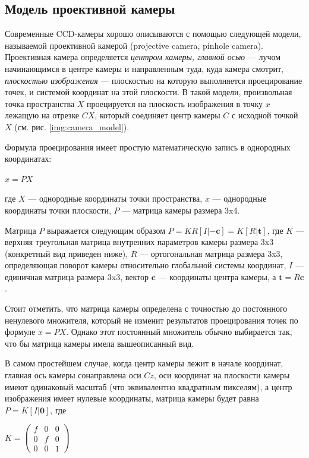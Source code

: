 \subsection{Модель проективной камеры}
Современные CCD-камеры хорошо описываются с помощью следующей модели, называемой проективной камерой (projective camera, pinhole camera). Проективная камера определяется \textit{центром камеры, главной осью} — лучом начинающимся в центре камеры и направленным туда, куда камера смотрит, \textit{плоскостью изображения} — плоскостью на которую выполняется проецирование точек, и системой координат на этой плоскости. В такой модели, произвольная точка пространства $X$ проецируется на плоскость изображения в точку $x$ лежащую на отрезке $CX$, который соединяет центр камеры $C$ с исходной точкой $X$ (см. рис. \ref{img:camera_model}).

Формула проецирования имеет простую математическую запись в однородных координатах: 

$x = P X$

где $X$ — однородные координаты точки пространства, $x$ — однородные координаты точки плоскости, $P$ — матрица камеры размера 3x4.



Матрица $P$ выражается следующим образом $P = KR[ I | -\textbf{c}] = K[R|\textbf{t}]$, где $K$ — верхняя треугольная матрица внутренних параметров камеры размера 3x3 (конкретный вид приведен ниже), $R$ — ортогональная матрица размера 3x3, определяющая поворот камеры относительно глобальной системы координат, $I$ — единичная матрица размера 3x3, вектор $\textbf{c}$ — координаты центра камеры, а $\textbf{t} = R\textbf{c}$.

Стоит отметить, что матрица камеры определена с точностью до постоянного ненулевого множителя, который не изменит результатов проецирования точек по формуле $x = P X$. Однако этот постоянный множитель обычно выбирается так, что бы матрица камеры имела вышеописанный вид.

В самом простейшем случае, когда центр камеры лежит в начале координат, главная ось камеры сонаправлена оси $Cz$, оси координат на плоскости камеры имеют одинаковый масштаб (что эквивалентно квадратным пикселям), а центр изображения имеет нулевые координаты, матрица камеры будет равна $P = K[I|\textbf{0}]$, где

$K = \begin{pmatrix}
	f & 0 & 0\\
	0 & f & 0\\
	0 & 0 & 1
\end{pmatrix}$

